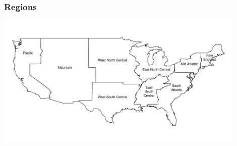 \documentclass[t]{beamer}\usepackage[]{graphicx}\usepackage[]{color}
\begin{document}
\begin{frame}[label=regions]
\frametitle{Regions}

\vfill
\begin{center}
\includegraphics[width=0.9\textwidth]{figs/pm_regions.pdf}
\end{center}
\vfill

\end{frame}
\end{document}
